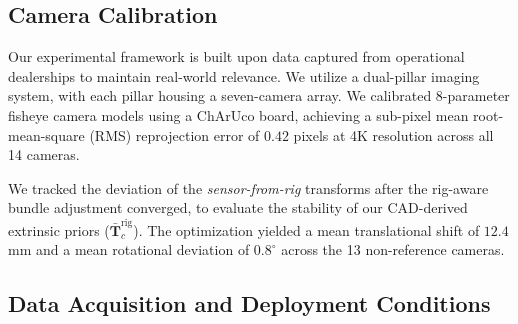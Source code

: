 \documentclass[letterpaper, 10 pt, conference]{ieeeconf}  %
\begin{document}
\subsection{Camera Calibration } 
\label{subsec:experiments_camera_calibration}

Our experimental framework is built upon data captured from operational dealerships to maintain real-world relevance. We utilize a dual-pillar imaging system, with each pillar housing a seven-camera array. We calibrated 8-parameter fisheye camera models using a ChArUco board, achieving a sub-pixel mean root-mean-square (RMS) reprojection error of $0.42$ pixels at 4K resolution across all 14 cameras.

 We tracked the deviation of the \textit{sensor-from-rig} transforms after the rig-aware bundle adjustment converged, to evaluate the stability of our CAD-derived extrinsic priors ($\bar{\mathbf{T}}^{\text{rig}}_{c}$). The optimization yielded a mean translational shift of $12.4$ mm and a mean rotational deviation of $0.8^\circ$ across the 13 non-reference cameras. 
 








\subsection{Data Acquisition and Deployment Conditions}
\label{subsec:experiments_data_acquisition_and_deployment_conditions}

\end{document}
